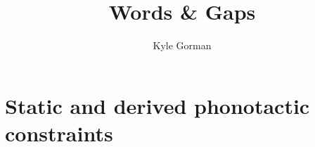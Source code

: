 \documentclass{upenndiss}
\title{Words \& Gaps}
\author{Kyle Gorman}
\begin{document}
\frenchspacing
\chapter{Static and derived phonotactic constraints} 
\appendix
\renewcommand{\arraystretch}{0.25}
%
%

%



\end{document}
